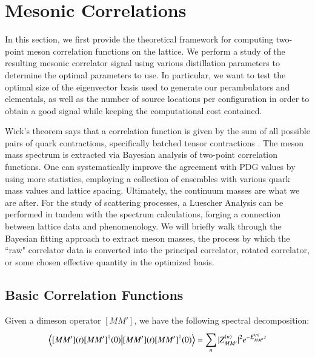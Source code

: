 
\chapter{Mesonic Correlations}
\label{sec:signal}

In this section, we first provide the theoretical framework for computing two-point meson correlation functions on the lattice. We perform a study of the resulting mesonic correlator signal using various distillation parameters to determine the optimal parameters to use. In particular, we want to test the optimal size of the eigenvector basis used to generate our perambulators and elementals, as well as the number of source locations per configuration in order to obtain a good signal while keeping the computational cost contained. 

Wick's theorem says that a correlation function is given by the sum of all possible pairs of quark contractions, specifically batched tensor contractions \cite{Chen:2023zyy}. 
The meson mass spectrum is extracted via Bayesian analysis of two-point correlation functions. One can systematically improve the agreement with PDG values by using more statistics, employing a collection of ensembles with various quark mass values and lattice spacing. Ultimately, the continuum masses are what we are after. For the study of scattering processes, a Luescher Analysis can be performed in tandem with the spectrum calculations, forging a connection between lattice data and phenomenology. We will briefly walk through the Bayesian fitting approach to extract meson masses, the process by which the ``raw" correlator data is converted into the principal correlator, rotated correlator, or some chosen effective quantity in the optimized basis. 

\section{Basic Correlation Functions}
Given a dimeson operator $[MM']$, we have the following spectral decomposition: 
\begin{align}
    \braket{[MM'](t) [MM']^\dagger(0)} = \sum_{n}^{} |Z_{MM'}^{(n)}|^2 e^{-E_{MM'}^{(n)}t}
\end{align}

